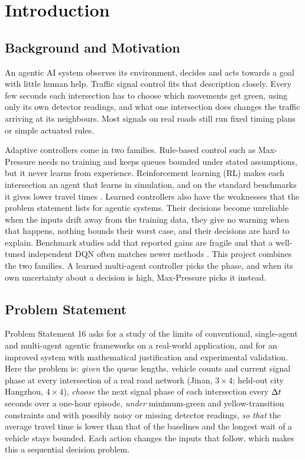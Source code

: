 \chapter{Introduction}
\label{ch:intro}

\section{Background and Motivation}

An agentic AI system observes its environment, decides and acts towards a goal with little
human help. Traffic signal control fits that description closely. Every few seconds each
intersection has to choose which movements get green, using only its own detector readings,
and what one intersection does changes the traffic arriving at its neighbours. Most signals
on real roads still run fixed timing plans or simple actuated rules.

Adaptive controllers come in two families. Rule-based control such as Max-Pressure
\citep{varaiya2013max} needs no training and keeps queues bounded under stated assumptions,
but it never learns from experience. Reinforcement learning (RL) makes each intersection an
agent that learns in simulation, and on the standard benchmarks it gives lower travel times
\citep{wei2019presslight,wei2019colight}. Learned controllers also have the weaknesses that
the problem statement lists for agentic systems. Their decisions become unreliable when the
inputs drift away from the training data, they give no warning when that happens, nothing
bounds their worst case, and their decisions are hard to explain. Benchmark studies add that
reported gains are fragile and that a well-tuned independent DQN often matches newer methods
\citep{ault2021reinforcement}. This project combines the two families. A learned multi-agent
controller picks the phase, and when its own uncertainty about a decision is high, Max-Pressure
picks it instead.

\section{Problem Statement}

Problem Statement 16 asks for a study of the limits of conventional, single-agent and
multi-agent agentic frameworks on a real-world application, and for an improved system with
mathematical justification and experimental validation. Here the problem is:
\emph{given} the queue lengths, vehicle counts and current signal phase at every
intersection of a real road network (Jinan, $3\times4$; held-out city Hangzhou,
$4\times4$), \emph{choose} the next signal phase of each intersection every
$\Delta t$ seconds over a one-hour episode, \emph{under} minimum-green and yellow-transition
constraints and with possibly noisy or missing detector readings, \emph{so that} the
average travel time is lower than that of the baselines and the longest wait of a vehicle
stays bounded. Each action changes the inputs that follow, which makes this a sequential
decision problem.

